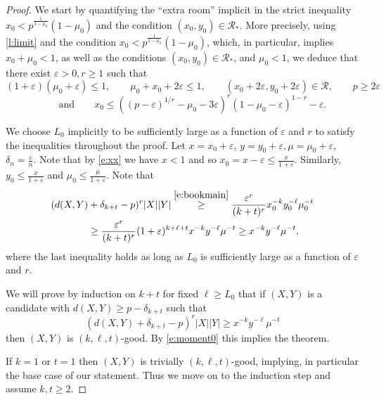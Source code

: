 \documentclass[reqno,final,12pt]{amsart}
\newcommand{\eps}{\varepsilon}
\newcommand{\mc}[1]{\mathcal{#1}}
\begin{document}
\begin{proof} We start by quantifying the ``extra room'' implicit in the strict inequality $x_0 < p^{\frac{1}{1-\mu_0}}(1-\mu_0)$ and the condition $(x_0,y_0) \in \mc{R_*}$. More precisely, using \cref{l:limit} and the condition $x_0 < p^{\frac{1}{1-\mu_0}}(1-\mu_0)$, which, in particular, implies $x_0+\mu_0<1$, as well as the conditions $(x_0,y_0) \in \mc{R_*}$, and $\mu_0<1$, we deduce that   there exist $\eps > 0, r \geq 1$ such that $$ (1+\eps)(\mu_0+\eps) \leq 1, \qquad \mu_0+x_0+2\eps \leq 1, \qquad (x_0+2\eps, y_0 +2\eps) \in \mc{R}, \qquad p \geq 2\eps $$
 \begin{equation}\label{e:xx} \qquad \mathrm{and} \qquad x_0  \leq  ((p-\eps)^{1/r} -  \mu_0-3\eps)^{r}(1-\mu_0-\eps)^{1-r} -\eps.\end{equation} 

 We choose $L_0$ implicitly to be sufficiently large as a function of $\eps$ and $r$ to satisfy the  inequalities throughout the proof.
 Let $x=x_0 +\eps$, $y=y_0+\eps, \mu = \mu_0+\eps$,	$\delta_{n}=\frac{\eps}{n}$. Note that by \eqref{e:xx} we have $x < 1$ and so $x_0 = x-\eps \leq \frac{x}{1+\eps}$. Similarly, $y_0  \leq \frac{x}{1+\eps}$ and  $\mu_0 \leq \frac{\mu}{1+\eps}$. 
Note that
\begin{align} (d(X,Y) &+ \delta_{k+t} - p)^r |X||Y| \stackrel{\eqref{e:bookmain}}{\geq} 
	 \frac{\eps^r}{(k+t)^r}x_0^{-k}y_0^{-\ell}\mu_0^{-t } \notag\\ &\geq \frac{\eps^r}{(k+t)^r}(1+\eps)^{k+\ell+t} x^{-k}y^{-\ell}\mu^{-t } \geq x^{-k}y^{-\ell}\mu^{-t },\label{e:moment0}
\end{align}
where the last inequality holds as long as $L_0$ is sufficiently large as a function of $\eps$ and $r$.

We will prove by induction on $k+ t$ for fixed $\ell \geq L_0$  that if $(X,Y)$ is a candidate with $d(X,Y) \geq p -\delta_{k+t}$ such that \begin{equation}\label{e:moment}
(d(X,Y) + \delta_{k+t} - p)^r |X||Y| \geq x^{-k}y^{-\ell}\mu^{-t }
\end{equation}  then 
 $(X,Y)$ is $(k,\ell,t)$-good. 	By \eqref{e:moment0} this  implies the theorem. 
 
 If $k=1$ or $t=1$ then $(X,Y)$ is trivially $(k,\ell,t)$-good, implying, in particular the base case of our statement. Thus we move on to the induction step and assume $k,t \geq 2$.
 

\end{proof}
\end{document}
